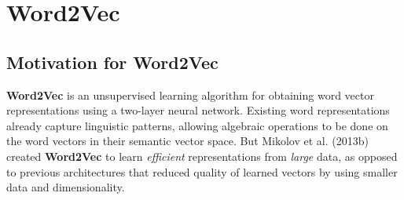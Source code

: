 \section{Word2Vec} \label{sec:Word2Vec}

 





\subsection{Motivation for Word2Vec}

\textbf{Word2Vec} is an unsupervised learning algorithm for obtaining word vector representations using a two-layer neural network. Existing word representations already capture linguistic patterns, allowing algebraic operations to be done on the word vectors in their semantic vector space. But Mikolov et al. (2013b) created \textbf{Word2Vec} to learn \emph{efficient} representations from \emph{large} data, as opposed to previous architectures that reduced quality of learned vectors by using smaller data and dimensionality. 


